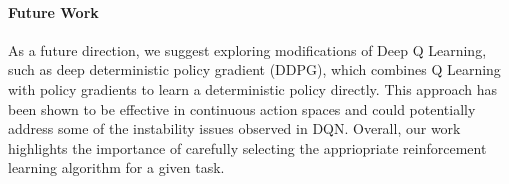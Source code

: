 \documentclass{article}
\begin{document}
\paragraph{Future Work} As a future direction, we suggest exploring modifications of Deep Q Learning,
such as deep deterministic policy gradient (DDPG), which combines Q Learning
with policy gradients to learn a deterministic policy directly. This approach
has been shown to be effective in continuous action spaces and could
potentially address some of the instability issues observed in DQN. Overall,
our work highlights the importance of carefully selecting the appriopriate
reinforcement learning algorithm for a given task.

\newpage
\nocite{*}


\end{document}
